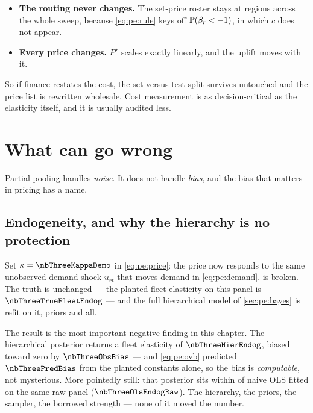 \begin{itemize}[leftmargin=*]
  \item \textbf{The routing never changes.} The set-price roster stays at \nbThreeNSet{} regions
        across the whole sweep, because \cref{eq:pe:rule} keys off $\operatorname{\mathbb{P}}(\beta_r < -1)$, in which
        $c$ does not appear.
  \item \textbf{Every price changes.} $P^\star$ scales exactly linearly, and the uplift moves with
        it.
\end{itemize}

So if finance restates the cost, the set-versus-test split survives untouched and the price list is
rewritten wholesale. Cost measurement is as decision-critical as the elasticity itself, and it is
usually audited less.

\section{What can go wrong}
\label{sec:pe:wrong}

Partial pooling handles \emph{noise}. It does not handle \emph{bias}, and the bias that matters in
pricing has a name.

\subsection*{Endogeneity, and why the hierarchy is no protection}

Set $\kappa = \nbThreeKappaDemo$ in \cref{eq:pe:price}: the price now responds to the same
unobserved demand shock $u_{rt}$ that moves demand in \cref{eq:pe:demand}.  is
broken. The truth is unchanged --- the planted fleet elasticity on this panel is
$\nbThreeTrueFleetEndog$ --- and the full hierarchical model of \cref{sec:pe:bayes} is refit on it,
priors and all.



The result is the most important negative finding in this chapter. The hierarchical posterior
returns a fleet elasticity of $\nbThreeHierEndog$, biased toward zero by $\nbThreeObsBias$ --- and
\cref{eq:pe:ovb} predicted $\nbThreePredBias$ from the planted constants alone, so the bias is
\emph{computable}, not mysterious. More pointedly still: that posterior sits within
\textbf{\nbThreeHierVsOls} of naive OLS fitted on the same raw panel ($\nbThreeOlsEndogRaw$). The
hierarchy, the priors, the sampler, the borrowed strength --- none of it moved the number.

